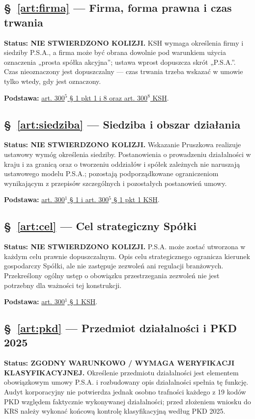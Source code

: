 \documentclass[12pt,a4paper]{report}
\begin{document}
\subsection*{§~\ref{art:firma} — Firma, forma prawna i czas trwania}
\textbf{Status: NIE STWIERDZONO KOLIZJI.} KSH wymaga określenia firmy i siedziby P.S.A., a firma może być obrana dowolnie pod warunkiem użycia oznaczenia „prosta spółka akcyjna”; ustawa wprost dopuszcza skrót „P.S.A.”. Czas nieoznaczony jest dopuszczalny — czas trwania trzeba wskazać w umowie tylko wtedy, gdy jest oznaczony.

\textbf{Podstawa:} \href{https://eli.gov.pl/api/acts/DU/2024/18/text.html}{art. 300$^{5}$ § 1 pkt 1 i 8 oraz art. 300$^{8}$ KSH}.

\subsection*{§~\ref{art:siedziba} — Siedziba i obszar działania}
\textbf{Status: NIE STWIERDZONO KOLIZJI.} Wskazanie Pruszkowa realizuje ustawowy wymóg określenia siedziby. Postanowienia o prowadzeniu działalności w kraju i za granicą oraz o tworzeniu oddziałów i spółek zależnych nie naruszają ustawowego modelu P.S.A.; pozostają podporządkowane ograniczeniom wynikającym z przepisów szczególnych i pozostałych postanowień umowy.

\textbf{Podstawa:} \href{https://eli.gov.pl/api/acts/DU/2024/18/text.html}{art. 300$^{1}$ § 1 i art. 300$^{5}$ § 1 pkt 1 KSH}.

\subsection*{§~\ref{art:cel} — Cel strategiczny Spółki}
\textbf{Status: NIE STWIERDZONO KOLIZJI.} P.S.A. może zostać utworzona w każdym celu prawnie dopuszczalnym. Opis celu strategicznego ogranicza kierunek gospodarczy Spółki, ale nie zastępuje zezwoleń ani regulacji branżowych. Przekreślony ogólny ustęp o obowiązku przestrzegania zezwoleń nie jest potrzebny dla ważności tej konstrukcji.

\textbf{Podstawa:} \href{https://eli.gov.pl/api/acts/DU/2024/18/text.html}{art. 300$^{1}$ § 1 KSH}.

\subsection*{§~\ref{art:pkd} — Przedmiot działalności i PKD 2025}
\textbf{Status: ZGODNY WARUNKOWO / WYMAGA WERYFIKACJI KLASYFIKACYJNEJ.} Określenie przedmiotu działalności jest elementem obowiązkowym umowy P.S.A. i rozbudowany opis działalności spełnia tę funkcję. Audyt korporacyjny nie potwierdza jednak osobno trafności każdego z 19 kodów PKD względem faktycznie wykonywanej działalności; przed złożeniem wniosku do KRS należy wykonać końcową kontrolę klasyfikacyjną według PKD 2025.
\end{document}
